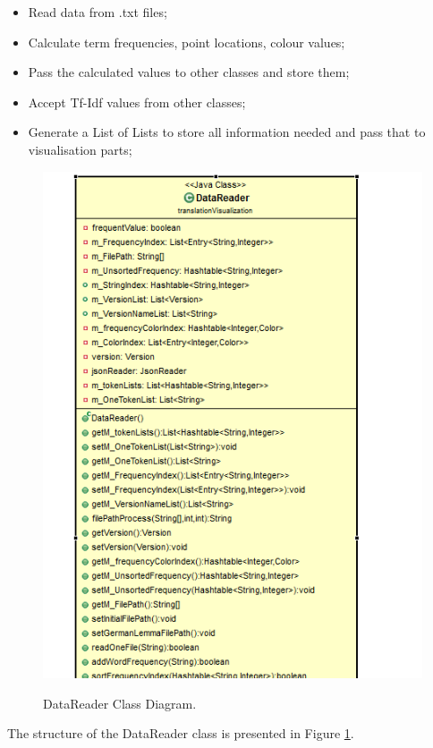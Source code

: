 \begin{itemize}
	\item \textbf{}Read data from .txt files;
	\item \textbf{}Calculate term frequencies, point locations, colour values; 
	\item \textbf{}Pass the calculated values to other classes and store them;
	\item \textbf{}Accept Tf-Idf values from other classes;
	\item \textbf{}Generate a List of Lists to store all information needed and pass that to visualisation parts;
\end{itemize} 
\begin{figure}[H]
	\centering    
	\includegraphics[scale=0.9]{Figs/DataReader}\\[1ex]
	\caption{DataReader Class Diagram. }
	\label{fig:dataReader}
\end{figure}

The structure of the DataReader class is presented in Figure \ref{fig:dataReader}.

